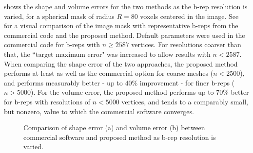  shows the shape and volume errors for the two methods as the b-rep resolution is varied, for a spherical mask of radius $R = 80$ voxels centered in the image. See~ for a visual comparison of the image mask with representative b-reps from the commercial code and the proposed method. Default parameters were used in the commercial code for b-reps with $n \ge 2587$ vertices. For resolutions coarser than that, the ``target maximum error" was increased to allow results with $n < 2587$. When comparing the shape error of the two approaches, the proposed method performs at least as well as the commercial option for coarse meshes ($n < 2500$), and performs measurably better - up to $40\%$ improvement - for finer b-reps ($n > 5000$). For the volume error, the proposed method performs up to $70\%$ better for b-reps with resolutions of $n < 5000$ vertices, and tends to a comparably small, but nonzero, value to which the commercial software converges.
\begin{figure}[ht!]
\centering
{}
%	
\caption{Comparison of shape error (a) and volume error (b) between commercial software and proposed method as b-rep resolution is varied.}
\label{fig:graph1}
\end{figure}
